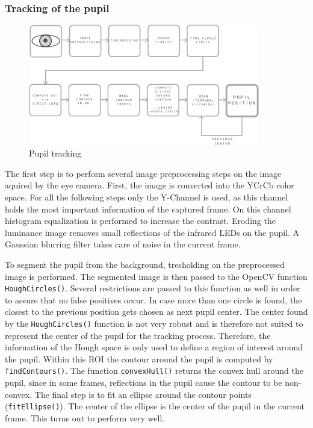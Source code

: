 \subsubsection{Tracking of the pupil}
\begin{figure}[H]
  \centering
  \includegraphics[width=0.9\textwidth]{../finalpres/02c.pdf}
  \caption{Pupil tracking}\label{fig:pupil}
\end{figure}
The first step is to perform several image preprocessing steps on the image aquired by the eye camera. First, the image is converted into the YCrCb color space.
For all the following steps only the Y-Channel is used, as this channel holds the most important information of the captured frame.
On this channel histogram equalization is performed to increase the contrast. 
Eroding the luminance image removes small reflections of the infrared LEDs on the pupil. 
A Gaussian blurring filter takes care of noise in the current frame. 

To segment the pupil from the background, tresholding on the preprocessed image is performed. 
The segmented image is then passed to the OpenCV function \texttt{HoughCircles()}. 
Several restrictions are passed to this function as well in order to assure that no false positives occur. 
In case more than one circle is found, the closest to the previous position gets chosen as next pupil center.
The center found by the \texttt{HoughCircles()} function is not very robust and is therefore not suited to represent the center of the pupil for the tracking process.
Therefore, the information of the Hough space is only used to define a region of interest around the pupil. 
Within this ROI the contour around the pupil is computed by \texttt{findContours()}. 
The function \texttt{convexHull()} returns the convex hull around the pupil, since in some frames, reflections in the pupil cause the contour to be non-convex.
The final step is to fit an ellipse around the contour points (\texttt{fitEllipse()}).
The center of the ellipse is the center of the pupil in the current frame. 
This turns out to perform very well. 

